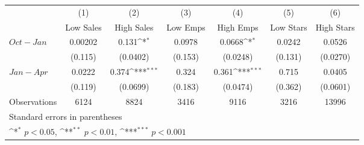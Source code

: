 {
\def\sym#1{\ifmmode^{#1}\else\(^{#1}\)\fi}
\begin{tabular}{l*{6}{c}}
\hline\hline
                    &\multicolumn{1}{c}{(1)}&\multicolumn{1}{c}{(2)}&\multicolumn{1}{c}{(3)}&\multicolumn{1}{c}{(4)}&\multicolumn{1}{c}{(5)}&\multicolumn{1}{c}{(6)}\\
                    &\multicolumn{1}{c}{Low Sales}&\multicolumn{1}{c}{High Sales}&\multicolumn{1}{c}{Low Emps}&\multicolumn{1}{c}{High Emps}&\multicolumn{1}{c}{Low Stars}&\multicolumn{1}{c}{High Stars}\\
\hline
$ Oct-Jan $         &     0.00202         &       0.131\sym{*}  &      0.0978         &      0.0668\sym{*}  &      0.0242         &      0.0526         \\
                    &     (0.115)         &    (0.0402)         &     (0.153)         &    (0.0248)         &     (0.131)         &    (0.0270)         \\
[1em]
$ Jan-Apr$          &      0.0222         &       0.374\sym{***}&       0.324         &       0.361\sym{***}&       0.715         &      0.0405         \\
                    &     (0.119)         &    (0.0699)         &     (0.183)         &    (0.0474)         &     (0.362)         &    (0.0601)         \\
\hline
Observations        &        6124         &        8824         &        3416         &        9116         &        3216         &       13996         \\
\hline\hline
\multicolumn{7}{l}{\footnotesize Standard errors in parentheses}\\
\multicolumn{7}{l}{\footnotesize \sym{*} \(p<0.05\), \sym{**} \(p<0.01\), \sym{***} \(p<0.001\)}\\
\end{tabular}
}
